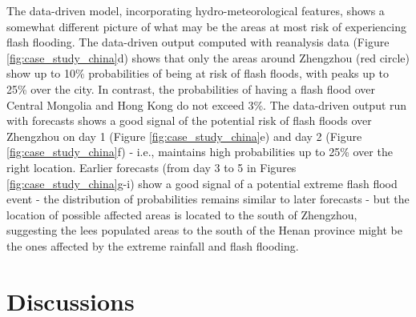 The  data-driven model, incorporating hydro-meteorological features, shows a somewhat different picture of what may be the areas at most risk of experiencing flash flooding. The data-driven output computed with reanalysis data (Figure \ref{fig:case_study_china}d) shows that only the areas around Zhengzhou (red circle) show up to 10\% probabilities of being at risk of flash floods, with peaks up to 25\% over the city. In contrast, the probabilities of having a flash flood over Central Mongolia and Hong Kong do not exceed 3\%. The data-driven output run with forecasts shows a good signal of the potential risk of flash floods over Zhengzhou on day 1 (Figure \ref{fig:case_study_china}e) and day 2 (Figure \ref{fig:case_study_china}f) - i.e., maintains high probabilities up to 25\% over the right location. Earlier forecasts (from day 3 to 5 in Figures \ref{fig:case_study_china}g-i) show a good signal of a potential extreme flash flood event - the distribution of probabilities remains similar to later forecasts - but the location of possible affected areas is located to the south of Zhengzhou, suggesting the lees populated areas to the south of the Henan province might be the ones affected by the extreme rainfall and flash flooding. 


  

\section{Discussions}
\label{regional_to_global_training_discussions}


